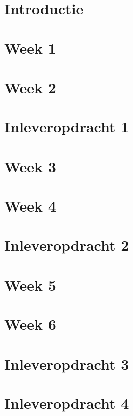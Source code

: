 \documentclass{./qh_global}
\begin{document}
\chapter{Introductie} 


\graphicspath{ {./oefeningen/images/} }
\chapter{Week 1} 

\chapter{Week 2} 


\graphicspath{ {./inleveropdrachten/images/} }
\chapter{Inleveropdracht 1} 


\graphicspath{ {./oefeningen/images/} }
\chapter{Week 3} 

\chapter{Week 4} 


\graphicspath{ {./inleveropdrachten/images/} }
\chapter{Inleveropdracht 2} 


\graphicspath{ {./oefeningen/images/} }
\chapter{Week 5} 

\chapter{Week 6} 


\graphicspath{ {./inleveropdrachten/images/} }
\chapter{Inleveropdracht 3} 

\chapter{Inleveropdracht 4} 

\end{document}
